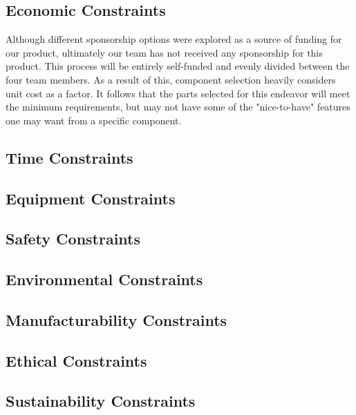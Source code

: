 \subsection{Economic Constraints}
Although different sponsorship options were explored as a source of
funding for our product, ultimately our team has not received any
sponsorship for this product. This process will be entirely
self-funded and evenly divided between the four team members. As a
result of this, component selection heavily considers unit cost as a
factor. It follows that the parts selected for this endeavor will meet
the minimum requirements, but may not have some of the "nice-to-have"
features one may want from a specific component. 
\subsection{Time Constraints}
\subsection{Equipment Constraints}
\subsection{Safety Constraints}
\subsection{Environmental Constraints}
\subsection{Manufacturability Constraints}
\subsection{Ethical Constraints}
\subsection{Sustainability Constraints}